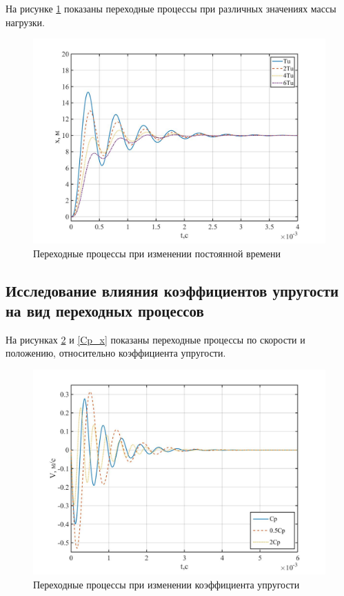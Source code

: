\documentclass[a4paper, 12pt]{article}
\begin{document}
На рисунке \ref{Tu_x} показаны переходные процессы при различных значениях массы нагрузки.

\begin{figure}[h!]
	\centering
	\includegraphics[width = 0.65\textheight]{data/Tu_x}
	\caption{Переходные процессы при изменении постоянной времени}
	\label{Tu_x}
\end{figure}

\newpage

\begin{center}
	\section{Исследование влияния коэффициентов упругости на вид переходных процессов}
\end{center}\par

На рисунках \ref{Cp_V} и \ref{Cp_x} показаны переходные процессы по скорости и положению, относительно коэффициента упругости.

\begin{figure}[h!]
	\centering
	\includegraphics[width = 0.65\textheight]{data/Cp_V}
	\caption{Переходные процессы при изменении коэффициента упругости}
	\label{Cp_V}
\end{figure}
\end{document}
